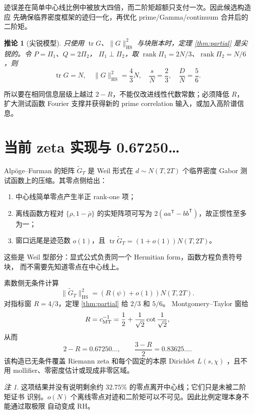 \documentclass[UTF8,11pt,a4paper]{ctexart}
\newtheorem{corollary}[theorem]{推论}
\theoremstyle{definition}
\theoremstyle{remark}
\newtheorem{remark}[theorem]{注}
\newcommand{\tr}{\operatorname{tr}}
\newcommand{\rank}{\operatorname{rank}}
\newcommand{\HS}{\mathrm{HS}}
\begin{document}
迹误差在简单中心线比例中被放大四倍，而二阶矩超额只支付一次。因此候选构造应
先确保临界密度框架的迹归一化，再优化 prime/Gamma/continuum 合并后的二阶矩。

\begin{corollary}[尖锐模型]\label{cor:sharp}
只使用 $\tr G$、$\|G\|_{\HS}^2$ 与块账本时，定理
\ref{thm:partial} 是尖锐的。令 $P=\Pi_1$、$Q=2\Pi_2$，
$\Pi_1\perp\Pi_2$，取 $\rank\Pi_1=2N/3$、$\rank\Pi_2=N/6$，则
\[
 \tr G=N,\quad \|G\|_{\HS}^2=\frac43N,\quad
 \frac{s}{N}=\frac23,\quad \frac{D}{N}=\frac56.
\]
\end{corollary}

所以要在相同信息层级上越过 $2-R$，不能仅改进线性代数常数；必须降低 $R$，
扩大测试函数 Fourier 支撑并获得新的 prime correlation 输入，或加入高阶谱信息。

\section{当前 zeta 实现与 0.67250\ldots}

Alpöge--Furman \cite{AF26} 的矩阵 $\widetilde G_T$ 是 Weil 形式在
$d\sim N(T,2T)$ 个临界密度 Gabor 测试函数上的压缩。其零点侧给出：
\begin{enumerate}[label=(Z\arabic*)]
\item 中心线简单零点产生半正 rank-one 项；
\item 离线函数方程对 $\{\rho,1-\bar\rho\}$ 的实矩阵项可写为
$2(aa^{\mathsf T}-bb^{\mathsf T})$，故正惯性至多为一；
\item 窗口远尾是迹范数 $o(1)$，且
$\tr\widetilde G_T=(1+o(1))N(T,2T)$。
\end{enumerate}
这些是 Weil 型部分：显式公式负责同一个 Hermitian form，函数方程负责符号块，
而不需要先知道零点在中心线上。

素数侧无条件计算
\[
 \|\widetilde G_T\|_{\HS}^2=(R(\psi)+o(1))N(T,2T).
\]
对指标窗 $R=4/3$，定理 \ref{thm:partial} 给 $2/3$ 和 $5/6$。
Montgomery--Taylor 窗给
\[
 R=c_{\rm MT}^{-1}
 =\frac12+\frac1{\sqrt2}\cot\frac1{\sqrt2},
\]
从而
\[
 2-R=0.67250\ldots,\qquad
 \frac{3-R}{2}=0.83625\ldots.
\]
该构造已无条件覆盖 Riemann zeta 和每个固定的本原 Dirichlet
$L(s,\chi)$ \cite{AF26}，且不用 mollifier、零密度估计或现成非零区域。

\begin{remark}
这项结果并没有说明剩余约 $32.75\%$ 的零点离开中心线；它们只是未被二阶矩证书
识别。$o(N)$ 个离线零点对迹和二阶矩可以不可见。因此比例定理本身不能通过取极限
自动变成 RH。
\end{remark}
\end{document}
